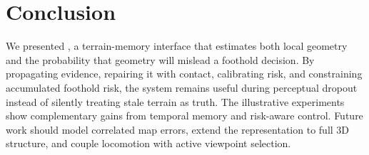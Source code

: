 \section{Conclusion}

We presented \method{}, a terrain-memory interface that estimates both local geometry and
the probability that geometry will mislead a foothold decision. By propagating evidence,
repairing it with contact, calibrating risk, and constraining accumulated foothold risk, the
system remains useful during perceptual dropout instead of silently treating stale terrain
as truth. The illustrative experiments show complementary gains from temporal memory and
risk-aware control. Future work should model correlated map errors, extend the representation
to full 3D structure, and couple locomotion with active viewpoint selection.
